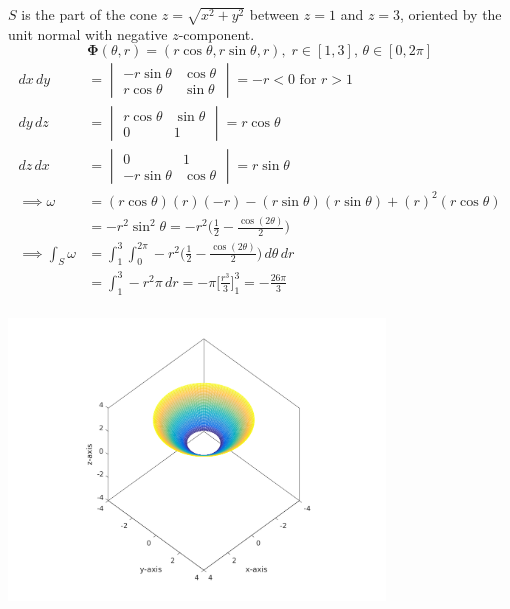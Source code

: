 \documentclass{article}
\begin{document}
\begin{enumerate}
\begin{enumerate}
        $S$ is the part of the cone $z = \sqrt{x^2 + y^2}$ between $z=1$ 
        and $z=3$,  oriented by the unit normal with negative $z$-component.
        \[ \boldsymbol \Phi (\theta, r) = 
        (r\cos \theta, r\sin \theta, r) 
        ,\; r \in [1,3] ,\, \theta \in [0,2\pi] \]
        \begin{align*}
            dx\, dy &= 
            \begin{vmatrix} -r\sin \theta & \cos \theta 
            \\ r\cos \theta & \sin \theta \end{vmatrix} = -r < 0 
            \text{ for } r > 1 \\
            dy\, dz &= 
            \begin{vmatrix}  r\cos \theta & \sin \theta \\ 0 & 1\end{vmatrix} 
            = r \cos \theta\\
            dz\, dx &= 
            \begin{vmatrix}  0 & 1 \\ -r\sin \theta & \cos \theta \end{vmatrix}
            = r \sin \theta\\
            \implies \omega &= 
            (r \cos \theta)(r)(-r) - (r \sin \theta)(r \sin \theta) 
            + (r)^2(r \cos \theta) \\
            &= -r^2 \sin^2 \theta = 
            -r^2\bigg( \frac{1}{2} - \frac{\cos(2\theta)}{2} \bigg) \\
            \implies \int_S \omega &= \int_1^3 \int_0^{2\pi} 
            -r^2\bigg( \frac{1}{2} - \frac{\cos(2\theta)}{2} \bigg) 
            \, d\theta \, dr \\
            &= \int_1^3 -r^2\pi \, dr = -\pi \bigg[ \frac{r^3}{3} \bigg]_1^3 
            = -\frac{26\pi}{3}\\
        \end{align*}

        \includegraphics[width=0.75\textwidth,center]{b42-a10-5c}


\end{enumerate}
\end{enumerate}
\end{document}
